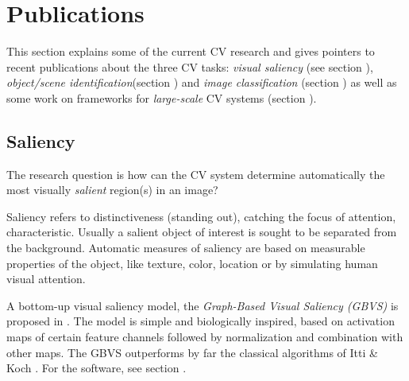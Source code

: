 \section{Publications}
\label{sec:pubs}

This section explains some of the current CV research and gives pointers to recent publications about the three CV tasks:  {\em visual saliency} (see section \underline{}), {\em object/scene identification}(section \underline{}) and {\em image classification} (section \underline{}) as well as some work on frameworks for {\em large-scale} CV systems (section \underline{}).

\subsection{Saliency}\label{subsec:sal}

The research question is how can the CV system determine automatically the most visually {\em salient} region(s) in an image? 

Saliency refers to distinctiveness (standing out), catching the focus of attention, characteristic. Usually a salient object of interest is sought to be separated from the background. Automatic measures of saliency are based on measurable properties of the object,
like texture, color, location or by simulating human visual attention.

A bottom-up visual saliency model, the {\em Graph-Based Visual Saliency (GBVS)} is proposed in \cite{Harel07graph-basedvisual}. The model is simple and biologically inspired, based on activation maps of certain feature channels followed by normalization and combination with other maps. The GBVS outperforms by far the classical algorithms of Itti \& Koch \cite{Itti_Koch01nrn}. For the software, see  section .

